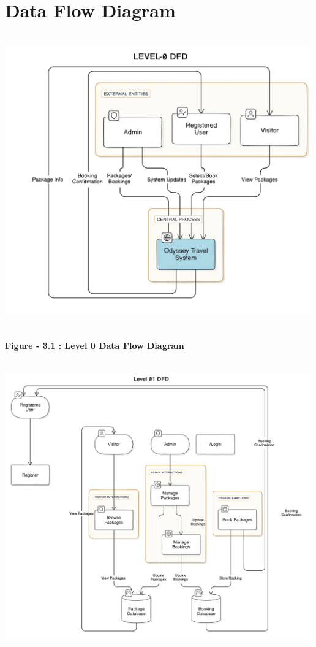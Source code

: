 \documentclass{scrreprt}
\begin{document}
\chapter{Data Flow Diagram }
\begin{center}
    {\includegraphics[width=500px, height=480px]{L0.png}}
\end{center}
\begin{center}

    \parbox{0.8\textwidth}{ 
        \centering
        \textbf{Figure - 3.1 : Level 0 Data Flow Diagram}
    }
\end{center}
\begin{center}
    {\includegraphics[width=500px, height=480px]{L1.png}}
\end{center}
\end{document}
